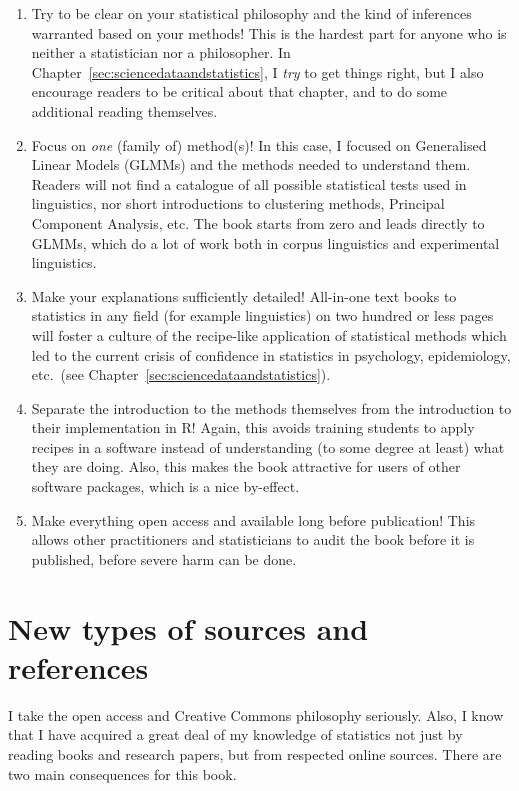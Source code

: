 \begin{enumerate}
  \item Try to be clear on your statistical philosophy and the kind of inferences warranted based on your methods!
    This is the hardest part for anyone who is neither a statistician nor a philosopher.
    In Chapter~\ref{sec:sciencedataandstatistics}, I \textit{try} to get things right, but I also encourage readers to be critical about that chapter, and to do some additional reading themselves.
  \item Focus on \textit{one} (family of) method(s)!
    In this case, I focused on Generalised Linear Models (GLMMs) and the methods needed to understand them.
    Readers will not find a catalogue of all possible statistical tests used in linguistics, nor short introductions to clustering methods, Principal Component Analysis, etc.
    The book starts from zero and leads directly to GLMMs, which do a lot of work both in corpus linguistics and experimental linguistics.
  \item Make your explanations sufficiently detailed!
    All-in-one text books to statistics in any field (for example linguistics) on two hundred or less pages will foster a culture of the recipe-like application of statistical methods which led to the current crisis of confidence in statistics in psychology, epidemiology, etc.\ (see Chapter~\ref{sec:sciencedataandstatistics}).
  \item Separate the introduction to the methods themselves from the introduction to their implementation in R!
    Again, this avoids training students to apply recipes in a software instead of understanding (to some degree at least) what they are doing.
    Also, this makes the book attractive for users of other software packages, which is a nice by-effect.
  \item Make everything open access and available long before publication!
    This allows other practitioners and statisticians to audit the book before it is published, \ie before severe harm can be done.
\end{enumerate}

\section*{New types of sources and references}

I take the open access and Creative Commons philosophy seriously.
Also, I know that I have acquired a great deal of my knowledge of statistics not just by reading books and research papers, but from respected online sources.
There are two main consequences for this book.

